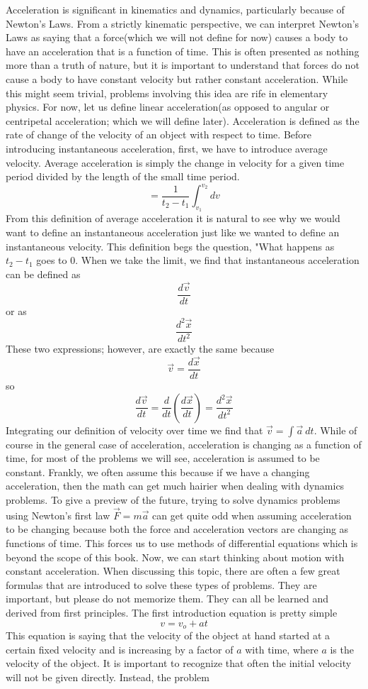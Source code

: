 Acceleration is significant in kinematics and dynamics, particularly 
because of Newton's Laws. From a strictly kinematic perspective, we can interpret Newton’s Laws as saying that a force(which we will not define for now) causes a body to have an acceleration that is a function of time. This is often presented as nothing more than a truth of nature, but it is important to understand that forces do not cause a body to have constant velocity but rather constant acceleration. While this might seem trivial, problems involving this idea are rife in elementary physics. For now, let us define linear acceleration(as opposed to angular or centripetal acceleration; which we will define later). Acceleration is defined as the rate of change of the velocity of an object with respect to time. Before introducing instantaneous acceleration, first, we have to introduce average velocity. Average acceleration is simply the change in velocity for a given time period divided by the length of the small time period. \begin{equation} = \frac{1}{t_2-t_1} \int_{v_1}^{v_2} dv\end{equation} From this definition of average acceleration it is natural to see why we would want to define an instantaneous acceleration just like we wanted to define an instantaneous velocity. This definition begs the question, "What happens as $t_2-t_1$ goes to 0. When we take the limit, we find that instantaneous acceleration can be defined as $$\frac{d\vec{v}}{dt}$$ or as $$\frac{d^2\vec{x}}{dt^2}$$ These two expressions; however, are exactly the same because $$\vec{v}= \frac{d\vec{x}}{dt}$$ so $$\frac{d\vec{v}}{dt} = \frac{d}{dt}\left(\frac{d\vec{x}}{dt}\right) = \frac{d^2\vec{x}}{dt^2}$$ Integrating our definition of velocity over time we find that $\vec{v} = \int \vec{a} \ dt$. While of course in the general case of acceleration, acceleration is changing as a function of time, for most of the problems we will see, acceleration is assumed to be constant. Frankly, we often assume this because if we have a changing acceleration, then the math can get much hairier when dealing with dynamics problems. To give a preview of the future, trying to solve dynamics problems using Newton's first law $\vec{F}=m\vec{a}$ can get quite odd when assuming acceleration to be changing because both the force and acceleration vectors are changing as functions of time. This forces us to use methods of differential equations which is beyond the scope of this book. Now, we can start thinking about motion with constant acceleration. When discussing this topic, there are often a few great formulas that are introduced to solve these types of problems. They are important, but please do not memorize them. They can all be learned and derived from first principles. The first introduction equation is pretty simple \begin{equation} v=v_o+at\end{equation} This equation is saying that the velocity of the object at hand started at a certain fixed velocity and is increasing by a factor of $a$ with time, where $a$ is the velocity of the object. It is important to recognize that often the initial velocity will not be given directly. Instead, the problem 